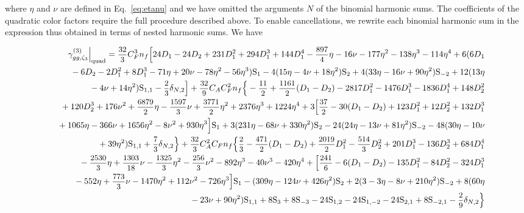 \documentclass[
 twocolumn,
 superscriptaddress,
 preprintnumbers,
 nofootinbib,
 amsmath,amssymb,
 aps,
 prl
 ]{revtex4-2}
\newcommand\HS{\mathrm{S}}
\def\D#1{D_#1}
\def\frct#1#2{\mbox{\small{$\displaystyle\frac{#1}{#2}$}}}
\begin{document}
where $\eta$ and $\nu$ are defined in Eq.~\eqref{eq:etanu} and we have omitted the arguments $N$ of the binomial harmonic sums.
The coefficients of the quadratic color factors require the full procedure described above.
To enable cancellations, we rewrite each binomial harmonic sum in the expression thus obtained in terms of nested harmonic sums.
We have
\begin{widetext}
\begin{eqnarray}
&&\gamma_{gg,\zeta_3}^{(3)}\Big|_{\mathrm{quad}}=





\frct{32}{3}\*C_F^3\*n_f\*
\Big[
24\*\D1
-24\*\D2
+231\*\D1^2
+294\*\D1^3
+144\*\D1^4
-\frct{897}{4}\*\eta
-16\*\nu
-177\*\eta^2
-138\*\eta^3
-114\*\eta^4
+6\*(
6\*\D1
\nonumber\\
&&{}
-6\*\D2
-2\*\D1^2
+8\*\D1^3
-71\*\eta
+20\*\nu
-78\*\eta^2
-56\*\eta^3
)\*\HS_{1}
-4\*(15\*\eta
-4\*\nu
+18\*\eta^2
)\*\HS_{2}
+4\*(33\*\eta
-16\*\nu
+90\*\eta^2
)\*\HS_{-2}
+12\*(13\*\eta
\nonumber\\
&&{}-4\*\nu
+14\*\eta^2
)\*\HS_{1,1}
-\frct{2}{3}\*\delta_{N,2}
\Big]

+\frct{32}{9}\*C_A\*C_F^2\*n_f\*\Big\{
-\frct{11}{2}
+\frct{1161}{2}\*(\D1-\D2)
-2817\*\D1^2
-1476\*\D1^3
-1836\*\D1^4
+148\*\D2^2
\nonumber\\
&&{}
+120\*\D2^3
+176\*\nu^2
+\frct{6879}{2}\*\eta
-\frct{1597}{3}\*\nu
+\frct{3771}{2}\*\eta^2
+2376\*\eta^3
+1224\*\eta^4
+3\*\Big[\frct{37}{2}
-30\*(\D1-\D2)
+123\*\D1^2
+12\*\D2^2
+132\*\D1^3
\nonumber\\
&&{}
+1065\*\eta
-366\*\nu
+1656\*\eta^2
-8\*\nu^2
+930\*\eta^3
\Big]\*\HS_{1}
+3\*(231\*\eta
-68\*\nu
+330\*\eta^2
)\*\HS_{2}
-24\*(24\*\eta
-13\*\nu
+81\*\eta^2
)\*\HS_{-2}
-48\*(30\*\eta
-10\*\nu
\nonumber\\
&&{}
+39\*\eta^2
)\*\HS_{1,1}
+\frct{7}{3}\*\delta_{N,2}
\Big\}

+\frct{32}{3}\*C_A^2\*C_F\*n_f\*\Big\{\frct{2}{3}
-\frct{471}{2}\*(\D1-\D2)
+\frct{2019}{2}\*\D1^2
-\frct{514}{3}\*\D2^2
+201\*\D1^3
-136\*\D2^3
+684\*\D1^4
\nonumber\\
&&{}
-\frct{2530}{3}\*\eta
+\frct{1303}{18}\*\nu
-\frct{1325}{3}\*\eta^2
-\frct{256}{3}\*\nu^2
-892\*\eta^3
-40\*\nu^3
-420\*\eta^4
+\Big[\frct{241}{6}
-6\*(\D1-\D2)
-135\*\D1^2
-84\*\D2^2
-324\*\D1^3
\nonumber\\
&&{}
-552\*\eta
+\frct{773}{3}\*\nu
-1470\*\eta^2
+112\*\nu^2
-726\*\eta^3
\Big]\*\HS_{1}
-(
309\*\eta
-124\*\nu
+426\*\eta^2
)\*\HS_{2}
+2\*(3
-3\*\eta
-8\*\nu
+210\*\eta^2
)\*\HS_{-2}
+8\*(60\*\eta
\nonumber\\
&&{}
-23\*\nu
+90\*\eta^2
)\*\HS_{1,1}
+8\*\HS_{3}
+8\*\HS_{-3}
-24\*\HS_{1,2}
-24\*\HS_{1,-2}
-24\*\HS_{2,1}
+8\*\HS_{-2,1}
-\frct{2}{9}\*\delta_{N,2}
\Big\}


\end{eqnarray}
\end{widetext}
\end{document}
